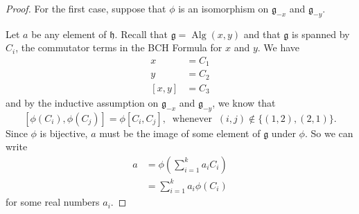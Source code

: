 \documentclass[honours]{UNSWthesis}
\newcommand{\g}{\mathfrak{g}}
\newcommand{\1}{\mathbf{e}_{1}}
\newcommand{\2}{\mathbf{e}_{3}}
\newcommand{\3}{\mathbf{e}_{3}}
\DeclareMathOperator{\alg}{Alg}
\begin{document}
\begin{proof}
For the first case, suppose that $\phi$ is an isomorphism on $\g_{-x}$ and $\g_{-y}$.

Let $a$ be any element of $\mathfrak{h}$. Recall that $\g = \alg(x,y)$ and that $\g$ is spanned by $C_{i}$, the commutator terms in the BCH Formula for $x$ and $y$. We have 
\begin{align*}
x&=C_{1}\\
y&=C_{2}\\
[x,y]&=C_{3}
\end{align*}
and by the inductive assumption on $\g_{-x}$ and $\g_{-y}$, we know that 
\[
[\phi(C_{i}),\phi(C_{j})]=\phi[C_{i},C_{j}],\;\;\text{whenever}\;\; (i,j) \notin \{(1,2),(2,1)\}.
\]
Since $\phi$ is bijective, $a$ must be the image of some element of $\g$ under $\phi$. So we can write 
\begin{align*}
a &=\phi\left(\sum\limits_{i=1}^{k}a_{i}C_{i}\right)\\
&=\sum\limits_{i=1}^{k} a_{i}\phi(C_{i})
\end{align*}
for some real numbers $a_{i}$.



\end{proof}
\end{document}
